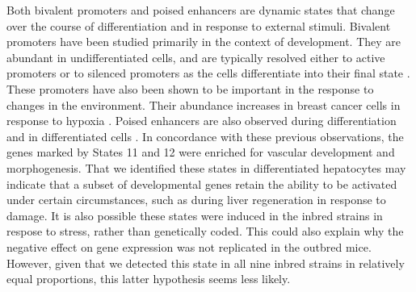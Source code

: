 \documentclass[
  11pt,
]{article}
\begin{document}
Both bivalent promoters and poised enhancers are dynamic states that
change over the course of differentiation and in response to external
stimuli. Bivalent promoters have been studied primarily in the context
of development. They are abundant in undifferentiated cells, and are
typically resolved either to active promoters or to silenced promoters
as the cells differentiate into their final state
\citep{pmid23788621, pmid22513113}. These promoters have also been shown
to be important in the response to changes in the environment. Their
abundance increases in breast cancer cells in response to hypoxia
\citep{pmid27800026}. Poised enhancers are also observed during
differentiation and in differentiated cells \citep{pmid32432110}. In
concordance with these previous observations, the genes marked by States
11 and 12 were enriched for vascular development and morphogenesis. That
we identified these states in differentiated hepatocytes may indicate
that a subset of developmental genes retain the ability to be activated
under certain circumstances, such as during liver regeneration in
response to damage. It is also possible these states were induced in the
inbred strains in respose to stress, rather than genetically coded. This
could also explain why the negative effect on gene expression was not
replicated in the outbred mice. However, given that we detected this
state in all nine inbred strains in relatively equal proportions, this
latter hypothesis seems less likely.
\end{document}
